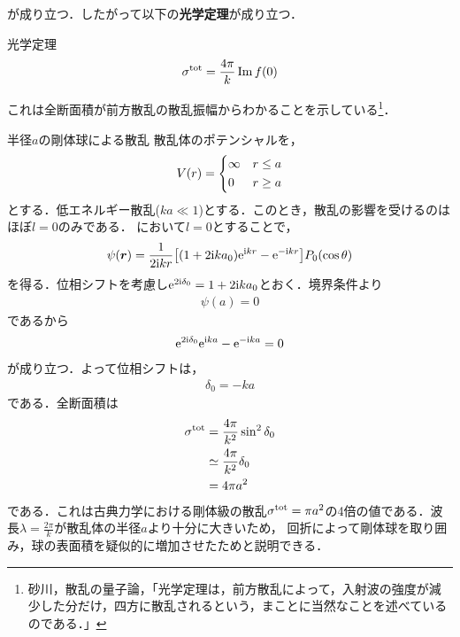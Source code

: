 \documentclass{report}
\begin{document}
  が成り立つ．したがって以下の\textbf{光学定理}が成り立つ．
  \begin{itembox}[l]{光学定理}
    \begin{align}
      \sigma^{\mathrm{tot}} = \frac{4\pi}{k} \Im f(0)
    \end{align}
  \end{itembox}
  これは全断面積が前方散乱の散乱振幅からわかることを示している\footnote{
    砂川，散乱の量子論，「光学定理は，前方散乱によって，入射波の強度が減少した分だけ，四方に散乱されるという，まことに当然なことを述べているのである．」 
  }．
  \begin{myex}{半径$a$の剛体球による散乱}{}
    散乱体のポテンシャルを，
    \begin{align}
      V(r) =
      \begin{dcases}
        \infty & r \leq a  \\
        0 & r \geq a
      \end{dcases}
    \end{align}
    とする．低エネルギー散乱($ka \ll 1$)とする．このとき，散乱の影響を受けるのはほぼ$l = 0$のみである．
    において$l = 0$とすることで，
    \begin{align}
      \psi(\bm{r}) = \frac{1}{2\mathrm{i} kr}\qty[(1 + 2\mathrm{i} k a_0)\mathrm{e}^{\mathrm{i} kr} - \mathrm{e}^{-\mathrm{i} kr}] P_0(\cos\theta)
    \end{align}
    を得る．位相シフトを考慮し$\mathrm{e}^{2\mathrm{i} \delta_0} = 1 + 2\mathrm{i} ka_0$とおく．境界条件より
    \begin{align}
      \psi(a) = 0
    \end{align}
    であるから
    \begin{align}
      \mathrm{e}^{2\mathrm{i} \delta_0}\mathrm{e}^{\mathrm{i} ka} - \mathrm{e}^{-\mathrm{i} ka} = 0
    \end{align}
    が成り立つ．よって位相シフトは，
    \begin{align}
      \delta_0 = -ka
    \end{align}
    である．全断面積は
    \begin{align}
      \sigma^{\mathrm{tot}} &= \frac{4\pi}{k^2}\sin^2\delta_0 \\
      &\simeq \frac{4\pi}{k^2}\delta_0 \\
      &= 4\pi a^2
    \end{align}
    である．これは古典力学における剛体級の散乱$\sigma^{\mathrm{tot}}=\pi a^2$の4倍の値である．波長$\lambda=\frac{2\pi}{k}$が散乱体の半径$a$より十分に大きいため，
    回折によって剛体球を取り囲み，球の表面積を疑似的に増加させたためと説明できる．
  \end{myex}
\end{document}
